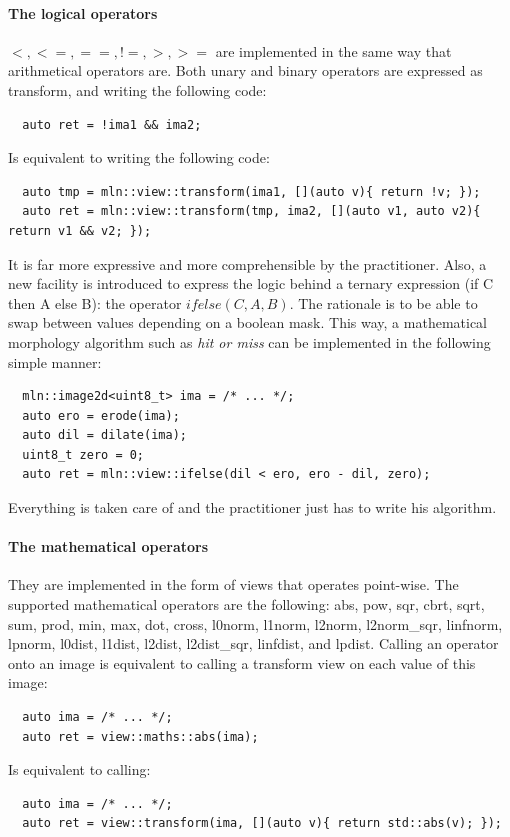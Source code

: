 \paragraph{The logical operators} \(<, <=, ==, !=, >, >=\) are implemented in the same way that arithmetical operators
are. Both unary and binary operators are expressed as transform, and writing the following code:
\begin{verbatim}
  auto ret = !ima1 && ima2;
\end{verbatim}
Is equivalent to writing the following code:
\begin{verbatim}
  auto tmp = mln::view::transform(ima1, [](auto v){ return !v; });
  auto ret = mln::view::transform(tmp, ima2, [](auto v1, auto v2){ return v1 && v2; });
\end{verbatim}
It is far more expressive and more comprehensible by the practitioner. Also, a new facility is introduced to express the
logic behind a ternary expression (if C then A else B): the operator \(ifelse(C, A, B)\). The rationale is to be able to
swap between values depending on a boolean mask. This way, a mathematical morphology algorithm such as \emph{hit or
  miss} can be implemented in the following simple manner:
\begin{verbatim}
  mln::image2d<uint8_t> ima = /* ... */;
  auto ero = erode(ima);
  auto dil = dilate(ima);
  uint8_t zero = 0;
  auto ret = mln::view::ifelse(dil < ero, ero - dil, zero);
\end{verbatim}
Everything is taken care of and the practitioner just has to write his algorithm.

\paragraph{The mathematical operators} They are implemented in the form of views that operates point-wise. The supported
mathematical operators are the following: abs, pow, sqr, cbrt, sqrt, sum, prod, min, max, dot, cross, l0norm, l1norm,
l2norm, l2norm\_sqr, linfnorm, lpnorm, l0dist, l1dist, l2dist, l2dist\_sqr, linfdist, and lpdist. Calling an operator
onto an image is equivalent to calling a transform view on each value of this image:
\begin{verbatim}
  auto ima = /* ... */;
  auto ret = view::maths::abs(ima);
\end{verbatim}
Is equivalent to calling:
\begin{verbatim}
  auto ima = /* ... */;
  auto ret = view::transform(ima, [](auto v){ return std::abs(v); });
\end{verbatim}


